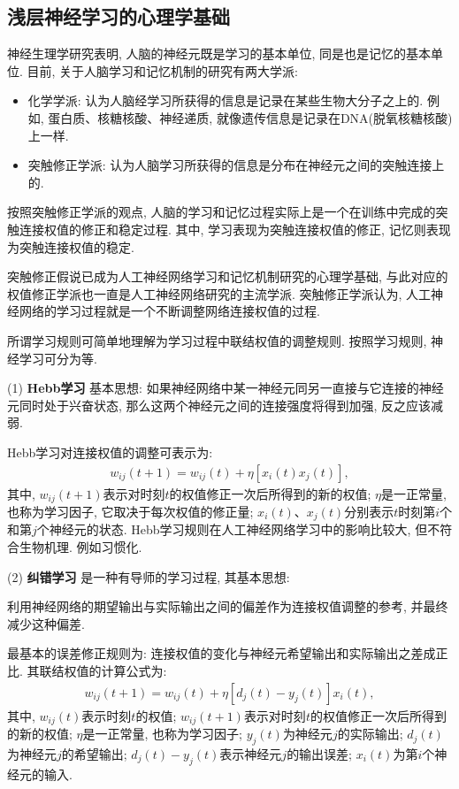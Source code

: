 \subsection{浅层神经学习的心理学基础}

神经生理学研究表明, 人脑的神经元既是学习的基本单位, 同是也是记忆的基本单位. 目前, 关于人脑学习和记忆机制的研究有两大学派:
\begin{itemize}
\item 化学学派: 认为人脑经学习所获得的信息是记录在某些生物大分子之上的. 例如, 蛋白质、核糖核酸、神经递质, 就像遗传信息是记录在DNA(脱氧核糖核酸)上一样.
\item 突触修正学派: 认为人脑学习所获得的信息是分布在神经元之间的突触连接上的.
\end{itemize}
按照突触修正学派的观点, 人脑的学习和记忆过程实际上是一个在训练中完成的突触连接权值的修正和稳定过程. 其中, 学习表现为突触连接权值的修正, 记忆则表现为突触连接权值的稳定.

突触修正假说已成为人工神经网络学习和记忆机制研究的心理学基础, 与此对应的权值修正学派也一直是人工神经网络研究的主流学派.
突触修正学派认为, 人工神经网络的学习过程就是一个不断调整网络连接权值的过程.

所谓学习规则可简单地理解为学习过程中联结权值的调整规则. 按照学习规则, 神经学习可分为等.

    (1) \textbf{Hebb学习} 基本思想: 如果神经网络中某一神经元同另一直接与它连接的神经元同时处于兴奋状态, 那么这两个神经元之间的连接强度将得到加强, 反之应该减弱.

Hebb学习对连接权值的调整可表示为:
\begin{align}
  w_{i j}(t+1)=w_{i j}(t)+\eta\left[x_{i}(t) x_{j}(t)\right],
\end{align}
其中, $w_{ij}(t+1)$表示对时刻$t$的权值修正一次后所得到的新的权值; $\eta$是一正常量, 也称为学习因子, 它取决于每次权值的修正量;
$x_i(t)$、$x_j(t)$分别表示$t$时刻第$i$个和第$j$个神经元的状态.
Hebb学习规则在人工神经网络学习中的影响比较大, 但不符合生物机理. 例如习惯化.

  (2) \textbf{纠错学习} 是一种有导师的学习过程, 其基本思想:

利用神经网络的期望输出与实际输出之间的偏差作为连接权值调整的参考, 并最终减少这种偏差.

最基本的误差修正规则为: 连接权值的变化与神经元希望输出和实际输出之差成正比. 其联结权值的计算公式为:
\begin{align}
  w_{i j}(t+1)=w_{i j}(t)+\eta\left[d_{j}(t)-y_{j}(t)\right] x_{i}(t),
\end{align}
其中,  $w_{ij}(t)$表示时刻$t$的权值;  $w_{ij}(t+1)$表示对时刻$t$的权值修正一次后所得到的新的权值; $\eta$是一正常量, 也称为学习因子; $y_j(t)$为神经元$j$的实际输出; $d_j(t)$为神经元$j$的希望输出; $d_j(t)-y_j(t)$表示神经元$j$的输出误差; $x_i(t)$为第$i$个神经元的输入.


